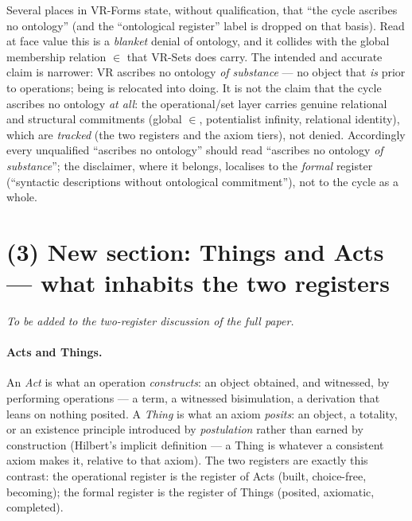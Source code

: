 \documentclass[11pt]{article}
\begin{document}
Several places in VR-Forms state, without qualification, that ``the cycle ascribes no ontology''
(and the ``ontological register'' label is dropped on that basis). Read at face value this is a
\emph{blanket} denial of ontology, and it collides with the global membership relation $\in$ that
VR-Sets does carry. The intended and accurate claim is narrower: VR ascribes no ontology \emph{of
substance} --- no object that \emph{is} prior to operations; being is relocated into doing. It is not
the claim that the cycle ascribes no ontology \emph{at all}: the operational/set layer carries genuine
relational and structural commitments (global $\in$, potentialist infinity, relational identity),
which are \emph{tracked} (the two registers and the axiom tiers), not denied. Accordingly every
unqualified ``ascribes no ontology'' should read ``ascribes no ontology \emph{of substance}''; the
disclaimer, where it belongs, localises to the \emph{formal} register (``syntactic descriptions
without ontological commitment''), not to the cycle as a whole.

\section*{(3) New section: Things and Acts --- what inhabits the two registers}

\noindent\emph{To be added to the two-register discussion of the full paper.}

\paragraph{Acts and Things.}
An \emph{Act} is what an operation \emph{constructs}: an object obtained, and witnessed, by
performing operations --- a term, a witnessed bisimulation, a derivation that leans on nothing
posited. A \emph{Thing} is what an axiom \emph{posits}: an object, a totality, or an existence
principle introduced by \emph{postulation} rather than earned by construction (Hilbert's implicit
definition --- a Thing is whatever a consistent axiom makes it, relative to that axiom). The two
registers are exactly this contrast: the operational register is the register of Acts (built,
choice-free, becoming); the formal register is the register of Things (posited, axiomatic,
completed).
\end{document}
